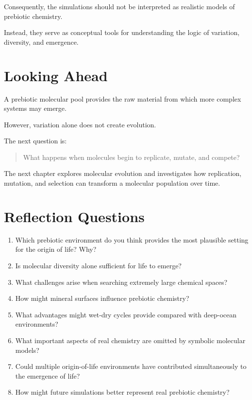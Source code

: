 \documentclass[
  oneside,
  openany]{book}
\providecommand{\tightlist}{%
  \setlength{\itemsep}{0pt}\setlength{\parskip}{0pt}}
\begin{document}
Consequently, the simulations should not be interpreted as realistic models of prebiotic chemistry.

Instead, they serve as conceptual tools for understanding the logic of variation, diversity, and emergence.

\section{Looking Ahead}\label{looking-ahead}

A prebiotic molecular pool provides the raw material from which more complex systems may emerge.

However, variation alone does not create evolution.

The next question is:

\begin{quote}
What happens when molecules begin to replicate, mutate, and compete?
\end{quote}

The next chapter explores molecular evolution and investigates how replication, mutation, and selection can transform a molecular population over time.

\section{Reflection Questions}\label{reflection-questions-1}

\begin{enumerate}
\def\labelenumi{\arabic{enumi}.}
\tightlist
\item
  Which prebiotic environment do you think provides the most plausible setting for the origin of life? Why?
\item
  Is molecular diversity alone sufficient for life to emerge?
\item
  What challenges arise when searching extremely large chemical spaces?
\item
  How might mineral surfaces influence prebiotic chemistry?
\item
  What advantages might wet-dry cycles provide compared with deep-ocean environments?
\item
  What important aspects of real chemistry are omitted by symbolic molecular models?
\item
  Could multiple origin-of-life environments have contributed simultaneously to the emergence of life?
\item
  How might future simulations better represent real prebiotic chemistry?
\end{enumerate}
\end{document}
